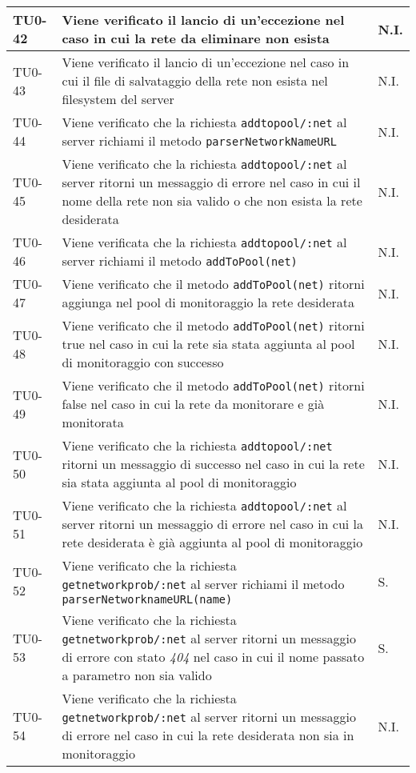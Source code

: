 \begin{longtable}{|C{.15\textwidth}|m{.65\textwidth}|C{.20\textwidth}|}
 \hline
{}TU0-42 & Viene verificato il lancio di un'eccezione nel caso in cui la rete da eliminare non esista & N.I. \\ 
\hline
 TU0-43 & Viene verificato il lancio di un'eccezione nel caso in cui il file di salvataggio della rete non esista nel filesystem del server & N.I. \\ 
 \hline
  TU0-44 & Viene verificato che la richiesta \texttt{addtopool/:net} al server richiami il metodo \texttt{parserNetworkNameURL} & N.I. \\ 
 \hline
 TU0-45 & Viene verificato che la richiesta \texttt{addtopool/:net} al server ritorni un messaggio di errore nel caso in cui il nome della rete non sia valido o che non esista la rete desiderata & N.I. \\ 
 \hline
 TU0-46 & Viene verificata che la richiesta \texttt{addtopool/:net} al server richiami il metodo \texttt{addToPool(net)} & N.I. \\ 
 \hline
 TU0-47 & Viene verificato che il metodo \texttt{addToPool(net)} ritorni aggiunga nel pool di monitoraggio la rete desiderata & N.I. \\
\hline
{} TU0-48 & Viene verificato che il metodo \texttt{addToPool(net)} ritorni true nel caso in cui la rete sia stata aggiunta al pool di monitoraggio con successo & N.I. \\ 
\hline 
TU0-49 & Viene verificato che il metodo \texttt{addToPool(net)} ritorni false nel caso in cui la rete da monitorare e già monitorata & N.I. \\ 
\hline
{} TU0-50 & Viene verificato che la richiesta \texttt{addtopool/:net} ritorni un messaggio di successo nel caso in cui la rete sia stata aggiunta al pool di monitoraggio & N.I. \\ 
\hline 
TU0-51 & Viene verificato che la richiesta \texttt{addtopool/:net} al server ritorni un messaggio di errore nel caso in cui la rete desiderata è già aggiunta al pool di monitoraggio & N.I. \\ 
\hline 
{} TU0-52 & Viene verificato che la richiesta \texttt{getnetworkprob/:net} al server richiami il metodo \texttt{parserNetworknameURL(name)} &  S. \\ 
\hline 
TU0-53 & Viene verificato che la richiesta \texttt{getnetworkprob/:net} al server ritorni un messaggio di errore con stato \textit{404} nel caso in cui il nome passato a parametro non sia valido & S. \\ 
\hline
{} TU0-54 & Viene verificato che la richiesta \texttt{getnetworkprob/:net} al server ritorni un messaggio di errore nel caso in cui la rete desiderata non sia in monitoraggio & N.I. \\ 

\end{longtable}
